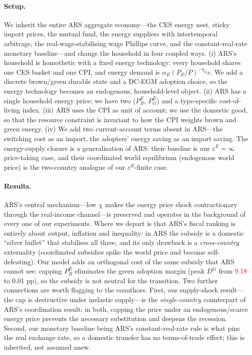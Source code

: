 \documentclass[11pt,a4paper]{article}
\newcommand{\NEEDSRERUN}[1]{\textcolor{red}{#1}}
\begin{document}
\paragraph{Setup.} We inherit the entire ARS aggregate economy---the CES
energy nest, sticky import prices, the mutual fund, the energy suppliers with
intertemporal arbitrage, the real-wage-stabilising wage Phillips curve, and the
constant-real-rate monetary baseline---and change the household in four coupled
ways. (i) ARS's household is homothetic with a fixed energy technology: every
household shares one CES basket and one CPI, and energy demand is
$\alpha_E(P_E/P)^{-\eta_E}c$. We add a discrete brown/green durable state and a
DC-EGM adoption choice, so the energy technology becomes an endogenous,
household-level object. (ii) ARS has a single household energy price; we have
two ($P^E_B$, $P^E_G$) and a type-specific cost-of-living index. (iii) ARS uses
the CPI as unit of account; we use the domestic good, so that the resource
constraint is invariant to how the CPI weights brown and green energy. (iv) We
add two current-account terms absent in ARS---the switching cost as an import,
the adopters' energy saving as an import saving. The energy-supply closure is a
generalisation of ARS: their baseline is our $\varepsilon^E=\infty$
price-taking case, and their coordinated world equilibrium (endogenous world
price) is the two-country analogue of our $\varepsilon^E$-finite case.

\paragraph{Results.} ARS's central mechanism---low $\chi$ makes the energy
price shock contractionary through the real-income channel---is preserved and
operates in the background of every one of our experiments. Where we depart is
that ARS's fiscal ranking is entirely about output, inflation and inequality:
in ARS the subsidy is a domestic ``silver bullet'' that stabilises all three,
and its only drawback is a \emph{cross-country} externality (coordinated
subsidies spike the world price and become self-defeating). Our model adds an
orthogonal cost of the same subsidy that ARS cannot see: capping $P^E_B$
eliminates the green adoption margin (peak $D^G$ from \NEEDSRERUN{9.18} to 0.01 pp), so the
subsidy is not neutral for the transition. Two further connections are worth
flagging to the coauthors. First, our supply-shock result---the cap is
destructive under inelastic supply---is the \emph{single-country} counterpart
of ARS's coordination result: in both, capping the price under an
endogenous/scarce energy price prevents the necessary substitution and deepens
the recession. Second, our monetary baseline being ARS's constant-real-rate
rule is what pins the real exchange rate, so a domestic transfer has no
terms-of-trade effect; this is inherited, not assumed anew.
\end{document}
